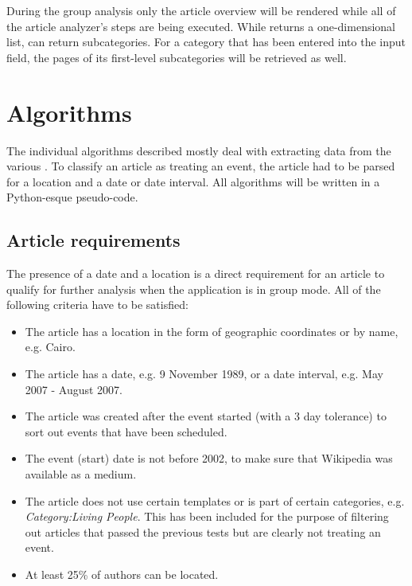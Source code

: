 During the group analysis only the article overview will be rendered while all of the article analyzer's steps are being executed.
While  returns a one-dimensional list,  can return subcategories.
For a category that has been entered into the input field, the pages of its first-level subcategories will be retrieved as well.


\section{Algorithms}\label{sec:algorithms}

The individual algorithms described mostly deal with extracting data from the various .
To classify an article as treating an event, the article had to be parsed for a location and a date or date interval.
All algorithms will be written in a Python-esque pseudo-code.

\subsection{Article requirements}\label{sub:articlerequirements}

The presence of a date and a location is a direct requirement for an article to qualify for further analysis when the application is in group mode.
All of the following criteria have to be satisfied:

\begin{itemize}
  \item The article has a location in the form of geographic coordinates or by name, e.g. Cairo.
  \item The article has a date, e.g. 9 November 1989, or a date interval, e.g. May 2007 - August 2007.
  \item The article was created after the event started (with a 3 day tolerance) to sort out events that have been scheduled.
  \item The event (start) date is not before 2002, to make sure that Wikipedia was available as a medium. 
  \item The article does not use certain templates or is part of certain categories, e.g. \emph{Category:Living People}.
  This has been included for the purpose of filtering out articles that passed the previous tests but are clearly not treating an event. 
  \item At least 25\% of authors can be located.
\end{itemize}


